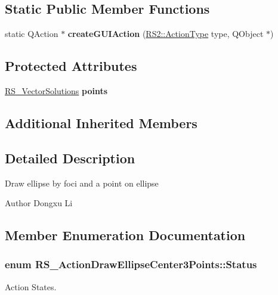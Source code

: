 \subsection*{Static Public Member Functions}
\begin{DoxyCompactItemize}
\item 
\hypertarget{classRS__ActionDrawEllipseCenter3Points_a92f9032d0091f6bb6e561a1d3e89aa28}{static Q\-Action $\ast$ {\bfseries create\-G\-U\-I\-Action} (\hyperlink{classRS2_afe3523e0bc41fd637b892321cfc4b9d7}{R\-S2\-::\-Action\-Type} type, Q\-Object $\ast$)}\label{classRS__ActionDrawEllipseCenter3Points_a92f9032d0091f6bb6e561a1d3e89aa28}

\end{DoxyCompactItemize}
\subsection*{Protected Attributes}
\begin{DoxyCompactItemize}
\item 
\hypertarget{classRS__ActionDrawEllipseCenter3Points_a85491f47c2c1fd7b7e6bd1fa4d31ba9a}{\hyperlink{classRS__VectorSolutions}{R\-S\-\_\-\-Vector\-Solutions} {\bfseries points}}\label{classRS__ActionDrawEllipseCenter3Points_a85491f47c2c1fd7b7e6bd1fa4d31ba9a}

\end{DoxyCompactItemize}
\subsection*{Additional Inherited Members}


\subsection{Detailed Description}
Draw ellipse by foci and a point on ellipse

\begin{DoxyAuthor}{Author}
Dongxu Li 
\end{DoxyAuthor}


\subsection{Member Enumeration Documentation}
\hypertarget{classRS__ActionDrawEllipseCenter3Points_a27797fe974f4348e0c028db1ed356aac}{
\subsubsection[{Status}]{\setlength{\rightskip}{0pt plus 5cm}enum {\bf R\-S\-\_\-\-Action\-Draw\-Ellipse\-Center3\-Points\-::\-Status}}}\label{classRS__ActionDrawEllipseCenter3Points_a27797fe974f4348e0c028db1ed356aac}
Action States. 

